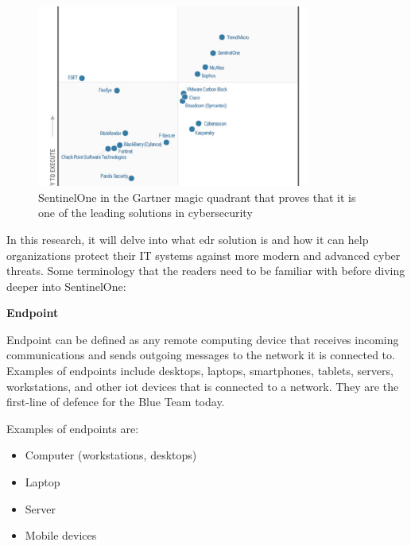\begin{figure}[H]
      \centering
      \includegraphics[width=0.8\textwidth]{Figures/Gartner.jpg}
      \caption{SentinelOne in the Gartner magic quadrant that proves that it is one of the leading solutions in cybersecurity}
      \label{fig:qaasAppModules}
\end{figure}

In this research, it will delve into what \acrshort{edr} solution is and how it can help organizations protect their IT systems against
more modern and advanced cyber threats. Some terminology that the readers need to be familiar with before diving deeper into SentinelOne:

\textbf{Endpoint}

Endpoint can be defined as any remote computing device that receives incoming communications and sends outgoing messages
to the network it is connected to. Examples of endpoints include desktops, laptops, smartphones, tablets, servers, workstations,
and other \acrshort{iot} devices that is connected to a network. They are the first-line of defence for the Blue Team today.

Examples of endpoints are:
\begin{itemize}
      \item Computer (workstations, desktops)
      \item Laptop
      \item Server
      \item Mobile devices
\end{itemize}



